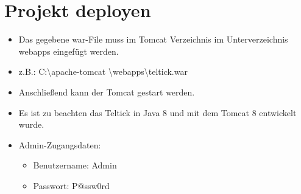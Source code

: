 \documentclass[12pt, a4paper]{article}
\begin{document}
\section{Projekt deployen}
\begin{itemize}
\item Das gegebene war-File muss im Tomcat Verzeichnis im Unterverzeichnis \glqq webapps\grqq{} eingefügt werden.
\item z.B.: \glqq C:\textbackslash apache-tomcat \textbackslash webapps\textbackslash teltick.war\grqq{}
\item Anschließend kann der Tomcat gestart werden.
\item Es ist zu beachten das \glqq Teltick\grqq{} in Java 8 und mit dem Tomcat 8 entwickelt wurde.
\item Admin-Zugangsdaten:
  \begin{itemize}
         \item Benutzername: Admin
         \item Passwort: P@ssw0rd
      \end{itemize}


\end{itemize}




\end{document}
